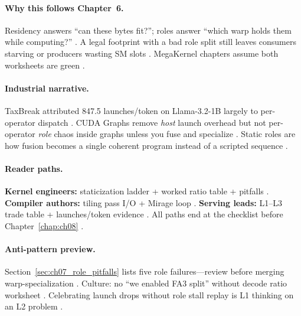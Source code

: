 \paragraph{Why this follows Chapter~6.}
Residency answers ``can these bytes fit?''; roles answer ``which warp holds them while computing?'' \citep{yirage2026,dao2022flashattention}.
A legal footprint with a bad role split still leaves consumers starving or producers wasting SM slots \citep{shah2024flashattention3,memoryfloor2026}.
MegaKernel chapters assume both worksheets are green \citep{mpk2025,wu2024mirage,chen2020compilerbasedhardw}.

\paragraph{Industrial narrative.}
TaxBreak attributed 847.5 launches/token on Llama-3.2-1B largely to per-operator dispatch \citep{taxbreak2026}.
CUDA Graphs remove \emph{host} launch overhead but not per-operator \emph{role} chaos inside graphs unless you fuse and specialize \citep{nvidia2024cudagraphs,shah2024flashattention3}.
Static roles are how fusion becomes a single coherent program instead of a scripted sequence \citep{mpk2025,yirage2026}.

\paragraph{Reader paths.}
\textbf{Kernel engineers:} staticization ladder + worked ratio table + pitfalls \citep{shah2024flashattention3,taxbreak2026}.
\textbf{Compiler authors:} tiling pass I/O + Mirage loop \citep{yirage2026,wu2024mirage,mpk2025}.
\textbf{Serving leads:} L1--L3 trade table + launches/token evidence \citep{patel2025llminference,nvidia2024cudagraphs}.
All paths end at the checklist before Chapter~\ref{chap:ch08} \citep{semianalysis2024tma,dao2022flashattention}.

\paragraph{Anti-pattern preview.}
Section~\ref{sec:ch07_role_pitfalls} lists five role failures---review before merging warp-specialization \citep{yirage2026,shah2024flashattention3}.
Culture: no ``we enabled FA3 split'' without decode ratio worksheet \citep{taxbreak2026,patel2025llminference}.
Celebrating launch drops without role stall replay is L1 thinking on an L2 problem \citep{nvidia2024cudagraphs,shah2024flashattention3,memoryfloor2026}.

